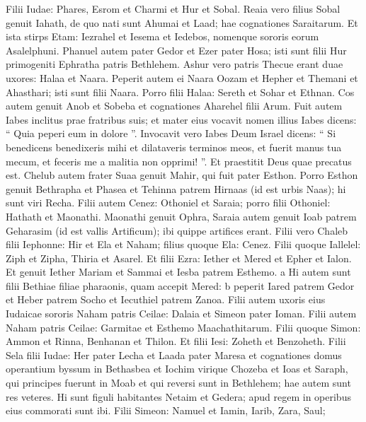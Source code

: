 \begin{biblechapter}
\begin{biblechapter}
\begin{biblechapter}
\begin{biblechapter}
\verse Filii Iudae: Phares, Esrom et Charmi et Hur et Sobal. 
\verse Reaia vero filius Sobal genuit Iahath, de quo nati sunt Ahumai et Laad; hae cognationes Saraitarum. 
\verse Et ista stirps Etam: Iezrahel et Iesema et Iedebos, nomenque sororis eorum Asalelphuni. 
\verse Phanuel autem pater Gedor et Ezer pater Hosa; isti sunt filii Hur primogeniti Ephratha patris Bethlehem. 
\verse Ashur vero patris Thecue erant duae uxores: Halaa et Naara. 
\verse Peperit autem ei Naara Oozam et Hepher et Themani et Ahasthari; isti sunt filii Naara. 
\verse Porro filii Halaa: Sereth et Sohar et Ethnan. 
\verse Cos autem genuit Anob et Sobeba et cognationes Aharehel filii Arum. 
\verse Fuit autem Iabes inclitus prae fratribus suis; et mater eius vocavit nomen illius Iabes dicens: “ Quia peperi eum in dolore ”. 
\verse Invocavit vero Iabes Deum Israel dicens: “ Si benedicens benedixeris mihi et dilataveris terminos meos, et fuerit manus tua mecum, et feceris me a malitia non opprimi! ”. Et praestitit Deus quae precatus est.
 \verse Chelub autem frater Suaa genuit Mahir, qui fuit pater Esthon. 
\verse Porro Esthon genuit Bethrapha et Phasea et Tehinna patrem Hirnaas (id est urbis Naas); hi sunt viri Recha. 
\verse Filii autem Cenez: Othoniel et Saraia; porro filii Othoniel: Hathath et Maonathi. 
\verse Maonathi genuit Ophra, Saraia autem genuit Ioab patrem Geharasim (id est vallis Artificum); ibi quippe artifices erant.
 \verse Filii vero Chaleb filii Iephonne: Hir et Ela et Naham; filius quoque Ela: Cenez. 
\verse Filii quoque Iallelel: Ziph et Zipha, Thiria et Asarel. 
\verse Et filii Ezra: Iether et Mered et Epher et Ialon. Et genuit Iether Mariam et Sammai et Iesba patrem Esthemo. 
\verse a Hi autem sunt filii Bethiae filiae pharaonis, quam accepit Mered: 
\verse b peperit Iared patrem Gedor et Heber patrem Socho et Iecuthiel patrem Zanoa. 
\verse Filii autem uxoris eius Iudaicae sororis Naham patris Ceilae: Dalaia et Simeon pater Ioman. Filii autem Naham patris Ceilae: Garmitae et Esthemo Maachathitarum. 
\verse Filii quoque Simon: Ammon et Rinna, Benhanan et Thilon. Et filii Iesi: Zoheth et Benzoheth.
 \verse Filii Sela filii Iudae: Her pater Lecha et Laada pater Maresa et cognationes domus operantium byssum in Bethasbea 
\verse et Iochim virique Chozeba et Ioas et Saraph, qui principes fuerunt in Moab et qui reversi sunt in Bethlehem; hae autem sunt res veteres. 
\verse Hi sunt figuli habitantes Netaim et Gedera; apud regem in operibus eius commorati sunt ibi.
 \verse Filii Simeon: Namuel et Iamin, Iarib, Zara, Saul; 

\end{biblechapter}
\end{biblechapter}
\end{biblechapter}
\end{biblechapter}
